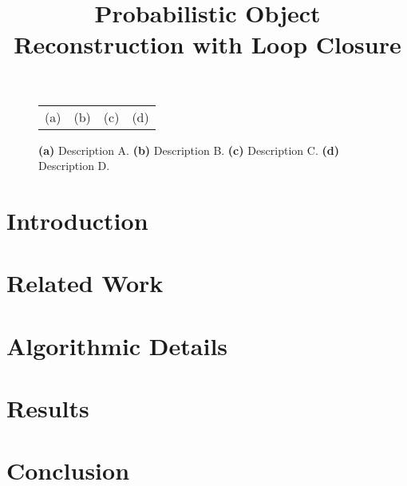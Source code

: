 \documentclass{bmvc2k}
\title{Probabilistic Object Reconstruction with Loop Closure}
\begin{document}
\maketitle

\begin{abstract}

\end{abstract}

\begin{figure}[h]
\centering
\begin{tabular}{cccc}
(a)&(b)&(c)&(d)
\end{tabular}
\caption{
\textbf{(a)} Description A.
\textbf{(b)} Description B.
\textbf{(c)} Description C.
\textbf{(d)} Description D.
}
\label{fig:demo}
\vspace{-1.5\baselineskip}
\end{figure}

\section{Introduction}
\label{sec:introduction}


\section{Related Work}
\label{sec:lit_review}


\section{Algorithmic Details}



\section{Results}
\label{sec:results}


\vspace{-\baselineskip}

\section{Conclusion}
\label{sec:discussion}



\end{document}
